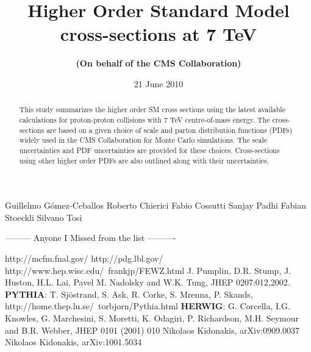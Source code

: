 \documentclass{cmspaper_pdf}
\begin{document}

\begin{titlepage}

  \date{21 June 2010}

  \title{Higher Order Standard Model cross-sections at 7 TeV}

  \begin{Authlist}
    Guillelmo G\'omez-Ceballos 
     Roberto Chierici
    Fabio Cossutti 
    Sanjay Padhi
    Fabian Stoeckli
    Silvano Tosi

--------- Anyone I Missed from the list ----------

  \end{Authlist}

  \author{\bf(On behalf of the CMS Collaboration)}

  \begin{abstract}
This study summarizes the higher order SM cross sections using the latest 
available calculations for proton-proton collisions with 7 TeV centre-of-mass 
energy. The cross-sections are based on a given choice of scale and parton 
distribution functions (PDFs) widely used in the CMS Collaboration for Monte 
Carlo simulations. The scale uncertainties and PDF uncertainties are provided 
for these choices. Cross-sections using other higher order PDFs are also 
outlined along with their uncertainties.
  \end{abstract}

\end{titlepage}

\setcounter{page}{2}%

%






\begin{thebibliography}{9}

http://mcfm.fnal.gov/
http://pdg.lbl.gov/
http://www.hep.wisc.edu/~frankjp/FEWZ.html
 J. Pumplin, D.R. Stump, J. Huston, H.L. Lai, Pavel M. Nadolsky and W.K. Tung, JHEP 0207:012,2002. 
 \textbf{PYTHIA}: T. Sj\"ostrand, S. Ask, R. Corke, S. Mrenna, P. Skands, http://home.thep.lu.se/~torbjorn/Pythia.html
 \textbf{HERWIG}: G. Corcella, I.G. Knowles, G. Marchesini, S. Moretti, K. Odagiri, P. Richardson, M.H. Seymour and B.R. Webber, JHEP 0101 (2001) 010
 Nikolaos Kidonakis, arXiv:0909.0037
 Nikolaos Kidonakis, arXiv:1001.5034
 
\end{thebibliography}
\end{document}
